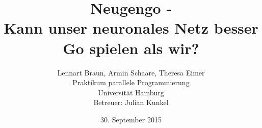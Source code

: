 \documentclass[12pt,a4paper]{article}
\author{Lennart Braun, Armin Schaare, Theresa Eimer 
		\\ Praktikum parallele Programmierung
		\\ Universität Hamburg
		\\ Betreuer: Julian Kunkel}
\title{Neugengo - \\ Kann unser neuronales Netz besser Go spielen als wir?}
\date{30. September 2015}
\begin{document}
\maketitle

\renewcommand{\contentsname}{Inhalt}
\tableofcontents

\newpage







\end{document}
